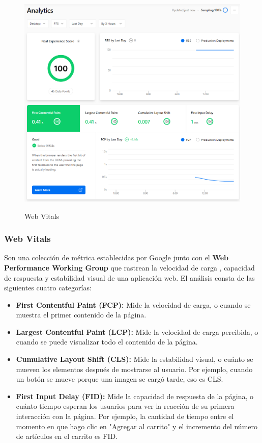\documentclass[12pt,twoside,titlepage]{report}
\begin{document}
\begin{figure}[H]
    \centering
    \includegraphics[scale=0.5]{Vercel/RealExperienceScore}
    \label{fig:Vercel_metrics}
    \caption{Web Vitals}
\end{figure}

\subsubsection{Web Vitals}

Son una colección de métrica establecidas por Google \cite{webdev} junto con el \textbf{Web Performance Working Group} \cite{w3} que rastrean la velocidad de carga , capacidad de respuesta y estabilidad visual de una aplicación web. El análisis consta de las siguientes cuatro categorías:

\begin{itemize}
    \item\textbf{First Contentful Paint (FCP):} Mide la velocidad de carga, o cuando se muestra el primer contenido de la página.
    \item\textbf{Largest Contentful Paint (LCP):} Mide la velocidad de carga percibida, o cuando se puede visualizar todo el contenido de la página.
    \item\textbf{Cumulative Layout Shift (CLS):} Mide la estabilidad visual, o cuánto se mueven los elementos después de mostrarse al usuario. Por ejemplo, cuando un botón se mueve porque una imagen se cargó tarde, eso es CLS.
    \item\textbf{First Input Delay (FID):} Mide la capacidad de respuesta de la página, o cuánto tiempo esperan los usuarios para ver la reacción de su primera interacción con la página. Por ejemplo, la cantidad de tiempo entre el momento en que hago clic en "Agregar al carrito" y el incremento del número de artículos en el carrito es FID.
\end{itemize}
\end{document}
